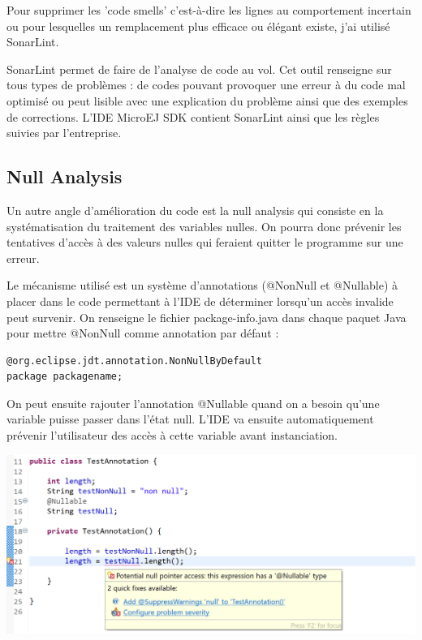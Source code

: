 \documentclass[french,a4paper,12pt]{report}
\begin{document}
Pour supprimer les 'code smells' c'est-à-dire les lignes au comportement incertain ou pour lesquelles un remplacement plus efficace ou élégant existe, j'ai utilisé SonarLint.

SonarLint permet de faire de l’analyse de code au vol. Cet outil renseigne sur tous types de problèmes : de codes pouvant provoquer une erreur à du code mal optimisé ou peut lisible avec une explication du problème ainsi que des exemples de corrections.
L'IDE MicroEJ SDK contient SonarLint ainsi que les règles suivies par l'entreprise.

\subsection{Null Analysis}

Un autre angle d'amélioration du code est la null analysis qui consiste en la systématisation du traitement des variables nulles. On pourra donc prévenir les tentatives d'accès à des valeurs nulles qui feraient quitter le programme sur une erreur. 

Le mécanisme utilisé est un système d'annotations (@NonNull et @Nullable) à placer dans le code permettant à l'IDE de déterminer lorsqu'un accès invalide peut survenir. On renseigne le fichier package-info.java dans chaque paquet Java pour mettre @NonNull comme annotation par défaut :

\begin{lstlisting}
@org.eclipse.jdt.annotation.NonNullByDefault
package packagename;
\end{lstlisting}

On peut ensuite rajouter l'annotation @Nullable quand on a besoin qu'une variable puisse passer dans l'état null. L'IDE va ensuite automatiquement prévenir l'utilisateur des accès à cette variable avant instanciation.

\begin{center}
  \includegraphics[width=\textwidth]{ressources/images/nonnull.png}
\end{center}
\end{document}
